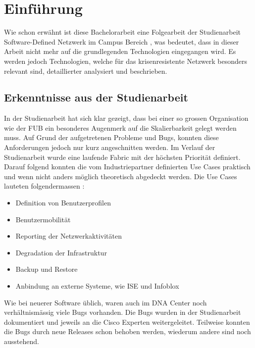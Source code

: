 \section{Einführung}

Wie schon erwähnt ist diese Bachelorarbeit eine Folgearbeit der Studienarbeit Software-Defined Netzwerk im Campus Bereich \cite{studienarbeit}, was bedeutet, dass in dieser Arbeit nicht mehr auf die grundlegenden Technologien eingegangen wird. Es werden jedoch Technologien, welche für das krisenresistente Netzwerk besonders relevant sind, detaillierter analysiert und beschrieben. 

\subsection{Erkenntnisse aus der Studienarbeit}

In der Studienarbeit hat sich klar gezeigt, dass bei einer so grossen Organisation wie der FUB ein besonderes Augenmerk auf die Skalierbarkeit gelegt werden muss. Auf Grund der aufgetretenen Probleme und Bugs, konnten diese Anforderungen jedoch nur kurz angeschnitten werden. Im Verlauf der Studienarbeit wurde eine laufende Fabric mit der höchsten Priorität definiert. Darauf folgend konnten die vom Industriepartner definierten Use Cases praktisch und wenn nicht anders möglich theoretisch abgedeckt werden. Die Use Cases lauteten folgendermassen \cite{studienarbeit}:

\begin{itemize}
	\item Definition von Benutzerprofilen
	\item Benutzermobilität
	\item Reporting der Netzwerkaktivitäten
	\item Degradation der Infrastruktur
	\item Backup und Restore
	\item Anbindung an externe Systeme, wie ISE und Infoblox
\end{itemize}


Wie bei neuerer Software üblich, waren auch im DNA Center noch verhältnismässig viele Bugs vorhanden. Die Bugs wurden in der Studienarbeit dokumentiert und jeweils an die Cisco Experten weitergeleitet. Teilweise konnten die Bugs durch neue Releases schon behoben werden, wiederum andere sind noch ausstehend. 


